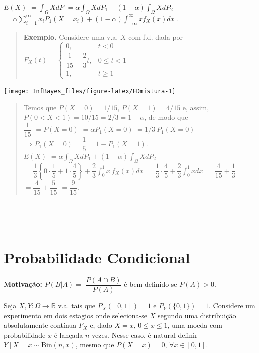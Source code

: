 \documentclass[
]{book}
\begin{document}
\(E(X)\) \(=\displaystyle\int_\Omega XdP\) \(=\displaystyle\alpha \int_\Omega XdP_1 + (1-\alpha)\int_\Omega XdP_2\) \(=\displaystyle\alpha \sum_{i=1}^\infty x_iP_1(X=x_i)+(1-\alpha)\int_{-\infty}^\infty x f_X(x)dx~.\)

\begin{quote}
\textbf{Exemplo.} Considere uma v.a. \(X\) com f.d. dada por\\
\(F_X(t)=\left\{\begin{array}{ll} 0, & t<0\\ \dfrac{1}{15}+\dfrac{2}{3}t, & 0\leq t < 1\\ 1, & t \geq 1\end{array}\right.\)
\end{quote}

\begin{center}\texttt{[image: InfBayes\_files/figure-latex/FDmistura-1]} \end{center}

\begin{quote}
Temos que \(P(X=0)=1/15\), \(P(X=1)=4/15\) e, assim, \(P(0<X<1)=10/15=2/3=1-\alpha\), de modo que\\
\(\dfrac{1}{15}\) \(=P(X=0)\) \(=\alpha P_1(X=0)\) \(=1/3~P_1(X=0)\)
\(\Rightarrow P_1(X=0)=\dfrac{1}{5} = 1-P_1(X=1)\).\\
\(E(X)\) \(=\displaystyle\alpha\int_\Omega XdP_1+(1-\alpha)\int_\Omega X dP_2\) \(=\displaystyle\dfrac{1}{3}\left\{0\cdot\dfrac{1}{5}+1\cdot\dfrac{4}{5}\right\}+\dfrac{2}{3}\int_{0}^{1} x~f_X(x)dx\) \(=\displaystyle\dfrac{1}{3}\cdot\dfrac{4}{5}+\dfrac{2}{3}\int_0^1 xdx\) \(=\dfrac{4}{15}+\dfrac{1}{3}\) \(=\dfrac{4}{15}+\dfrac{5}{15}\) \(=\dfrac{9}{15}\).
\end{quote}

\(~\)

\(~\)

\hypertarget{probabilidade-condicional}{%
\section{Probabilidade Condicional}\label{probabilidade-condicional}}

\textbf{Motivação:} \(P(B|A)=\) \(\dfrac{P(A\cap B)}{P(A)}\) é bem definido se \(P(A)>0.\)

Seja \(X,Y: \Omega \longrightarrow \mathbb{R}\) v.a. tais que \(P_X\left([0,1]\right)=1\) e \(P_Y\left(\{0,1\}\right)=1\). Considere um experimento em dois estagios onde seleciona-se \(X\) segundo uma distribuição absolutamente contínua \(F_X\) e, dado \(X=x\), \(0\leq x\leq 1\), uma moeda com probabilidade \(x\) é lançada \(n\) vezes. Nesse caso, é natural definir \(Y~\big|~X=x\sim \text{Bin}(n,x)\), mesmo que \(P(X=x)=0\), \(\forall x \in [0,1]\).
\end{document}
